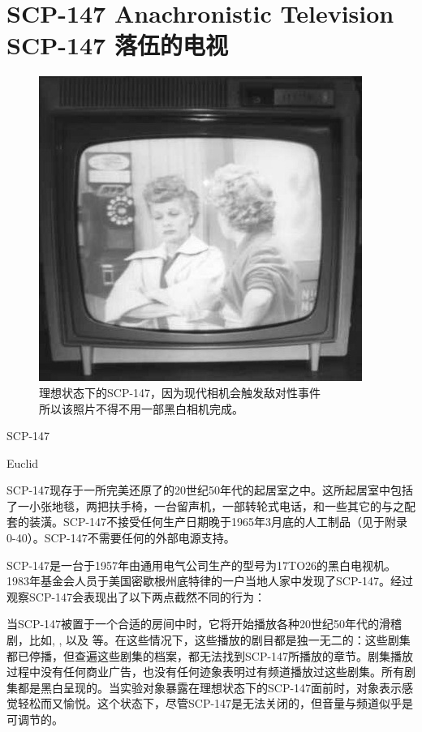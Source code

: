 \chapter[SCP-147 落伍的电视]{
    SCP-147 Anachronistic Television\\
    SCP-147 落伍的电视
}

\label{chap:SCP-147}

\begin{figure}[H]
    \centering
    \includegraphics[width=0.5\linewidth]{images/SCP.147.jpg}
    \caption*{理想状态下的SCP-147，因为现代相机会触发敌对性事件\\所以该照片不得不用一部黑白相机完成。}
\end{figure}

SCP-147

Euclid

SCP-147现存于一所完美还原了的20世纪50年代的起居室之中。这所起居室中包括了一小张地毯，两把扶手椅，一台留声机，一部转轮式电话，和一些其它的与之配套的装潢。SCP-147不接受任何生产日期晚于1965年3月底的人工制品（见于附录 0-40）。SCP-147不需要任何的外部电源支持。

SCP-147是一台于1957年由通用电气公司生产的型号为17TO26的黑白电视机。1983年基金会人员于美国密歇根州底特律的一户当地人家中发现了SCP-147。经过观察SCP-147会表现出了以下两点截然不同的行为：

当SCP-147被置于一个合适的房间中时，它将开始播放各种20世纪50年代的滑稽剧，比如, , 以及 等。在这些情况下，这些播放的剧目都是独一无二的：这些剧集都已停播，但查遍这些剧集的档案，都无法找到SCP-147所播放的章节。剧集播放过程中没有任何商业广告，也没有任何迹象表明过有频道播放过这些剧集。所有剧集都是黑白呈现的。当实验对象暴露在理想状态下的SCP-147面前时，对象表示感觉轻松而又愉悦。这个状态下，尽管SCP-147是无法关闭的，但音量与频道似乎是可调节的。


